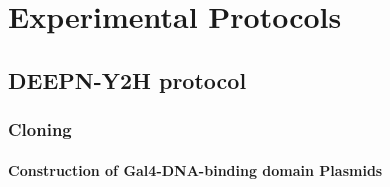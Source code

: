 \documentclass[11pt,fleqn]{book} %
\begin{document}


\pagestyle{empty} %

\tableofcontents %

\cleardoublepage %

\pagestyle{fancy} %


\part{Experimental Protocols}



\chapter{DEEPN-Y2H protocol}

\section{Cloning}

\subsection{Construction of Gal4-DNA-binding domain Plasmids}
\end{document}
